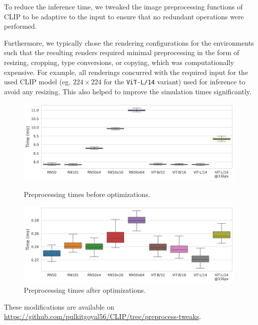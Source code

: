 To reduce the inference time, we tweaked the image preprocessing functions of CLIP to be adaptive to the input to ensure that no redundant operations were performed.

Furthermore, we typically chose the rendering configurations for the environments such that the resulting renders required minimal preprocessing in the form of resizing, cropping, type conversions, or copying, which was computationally expensive.
For example, all renderings concurred with the required input for the used CLIP model (eg. \(224 \times 224\) for the \texttt{ViT-L/14} variant) used for inference to avoid any resizing.
This also helped to improve the simulation times significantly.\\

\begin{figure}[H]
    \centering
    \includegraphics[width=\textwidth]{images/full_transform.png}\vspace{-15pt}
    \caption{Preprocessing times before optimizations.}\vspace{15pt}
    \includegraphics[width=\textwidth]{images/fast_transform.png}\vspace{-15pt}
    \caption{Preprocessing times after optimizations.}
    \label{fig:preprocessing-time-improvement}
\end{figure}

These modifications are available on \url{https://github.com/pulkitgoyal56/CLIP/tree/preprocess-tweaks}.
